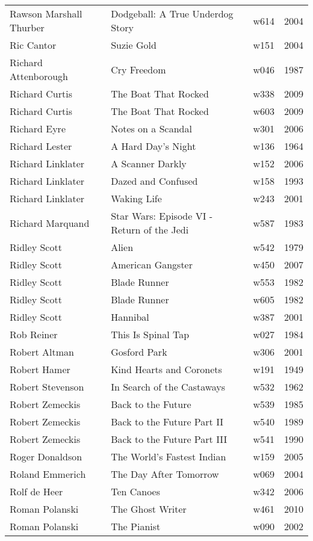 \documentclass{article}
\begin{document}
\begin {center}
\begin{longtable}{l p{10cm} l l}
Rawson Marshall Thurber & Dodgeball: A True Underdog Story & w614 & 2004 \\
Ric Cantor & Suzie Gold & w151 & 2004 \\
Richard Attenborough & Cry Freedom & w046 & 1987 \\
Richard Curtis & The Boat That Rocked & w338 & 2009 \\
Richard Curtis & The Boat That Rocked & w603 & 2009 \\
Richard Eyre & Notes on a Scandal & w301 & 2006 \\
Richard Lester & A Hard Day's Night & w136 & 1964 \\
Richard Linklater & A Scanner Darkly & w152 & 2006 \\
Richard Linklater & Dazed and Confused & w158 & 1993 \\
Richard Linklater & Waking Life & w243 & 2001 \\
Richard Marquand & Star Wars: Episode VI - Return of the Jedi & w587 & 1983 \\
Ridley Scott & Alien & w542 & 1979 \\
Ridley Scott & American Gangster & w450 & 2007 \\
Ridley Scott & Blade Runner & w553 & 1982 \\
Ridley Scott & Blade Runner & w605 & 1982 \\
Ridley Scott & Hannibal & w387 & 2001 \\
Rob Reiner & This Is Spinal Tap & w027 & 1984 \\
Robert Altman & Gosford Park & w306 & 2001 \\
Robert Hamer & Kind Hearts and Coronets & w191 & 1949 \\
Robert Stevenson & In Search of the Castaways & w532 & 1962 \\
Robert Zemeckis & Back to the Future & w539 & 1985 \\
Robert Zemeckis & Back to the Future Part II & w540 & 1989 \\
Robert Zemeckis & Back to the Future Part III & w541 & 1990 \\
Roger Donaldson & The World's Fastest Indian & w159 & 2005 \\
Roland Emmerich & The Day After Tomorrow & w069 & 2004 \\
Rolf de Heer & Ten Canoes & w342 & 2006 \\
Roman Polanski & The Ghost Writer & w461 & 2010 \\
Roman Polanski & The Pianist & w090 & 2002 \\

\end{longtable}
\end{center}
\end{document}

